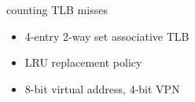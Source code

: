 \begin{frame}{counting TLB misses}
\begin{itemize}
\item 4-entry 2-way set associative TLB
\item LRU replacement policy
\item 8-bit virtual address, 4-bit VPN
\end{itemize}
\end{frame}
